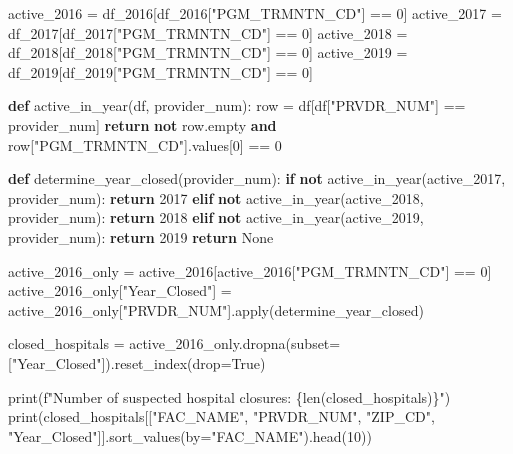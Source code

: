 \documentclass[
  letterpaper,
  DIV=11,
  numbers=noendperiod]{scrartcl}
\newenvironment{Shaded}{\begin{snugshade}}{\end{snugshade}}
\newcommand{\BuiltInTok}[1]{\textcolor[rgb]{0.00,0.23,0.31}{#1}}
\newcommand{\ControlFlowTok}[1]{\textcolor[rgb]{0.00,0.23,0.31}{\textbf{#1}}}
\newcommand{\DecValTok}[1]{\textcolor[rgb]{0.68,0.00,0.00}{#1}}
\newcommand{\KeywordTok}[1]{\textcolor[rgb]{0.00,0.23,0.31}{\textbf{#1}}}
\newcommand{\NormalTok}[1]{\textcolor[rgb]{0.00,0.23,0.31}{#1}}
\newcommand{\OperatorTok}[1]{\textcolor[rgb]{0.37,0.37,0.37}{#1}}
\newcommand{\SpecialCharTok}[1]{\textcolor[rgb]{0.37,0.37,0.37}{#1}}
\newcommand{\SpecialStringTok}[1]{\textcolor[rgb]{0.13,0.47,0.30}{#1}}
\newcommand{\StringTok}[1]{\textcolor[rgb]{0.13,0.47,0.30}{#1}}
\newcommand{\VariableTok}[1]{\textcolor[rgb]{0.07,0.07,0.07}{#1}}
\begin{document}
\begin{Shaded}
\begin{Highlighting}[]
\NormalTok{active\_2016 }\OperatorTok{=}\NormalTok{ df\_2016[df\_2016[}\StringTok{"PGM\_TRMNTN\_CD"}\NormalTok{] }\OperatorTok{==} \DecValTok{0}\NormalTok{]}
\NormalTok{active\_2017 }\OperatorTok{=}\NormalTok{ df\_2017[df\_2017[}\StringTok{"PGM\_TRMNTN\_CD"}\NormalTok{] }\OperatorTok{==} \DecValTok{0}\NormalTok{]}
\NormalTok{active\_2018 }\OperatorTok{=}\NormalTok{ df\_2018[df\_2018[}\StringTok{"PGM\_TRMNTN\_CD"}\NormalTok{] }\OperatorTok{==} \DecValTok{0}\NormalTok{]}
\NormalTok{active\_2019 }\OperatorTok{=}\NormalTok{ df\_2019[df\_2019[}\StringTok{"PGM\_TRMNTN\_CD"}\NormalTok{] }\OperatorTok{==} \DecValTok{0}\NormalTok{]}

\KeywordTok{def}\NormalTok{ active\_in\_year(df, provider\_num):}
\NormalTok{    row }\OperatorTok{=}\NormalTok{ df[df[}\StringTok{"PRVDR\_NUM"}\NormalTok{] }\OperatorTok{==}\NormalTok{ provider\_num]}
    \ControlFlowTok{return} \KeywordTok{not}\NormalTok{ row.empty }\KeywordTok{and}\NormalTok{ row[}\StringTok{"PGM\_TRMNTN\_CD"}\NormalTok{].values[}\DecValTok{0}\NormalTok{] }\OperatorTok{==} \DecValTok{0}

\KeywordTok{def}\NormalTok{ determine\_year\_closed(provider\_num):}
    \ControlFlowTok{if} \KeywordTok{not}\NormalTok{ active\_in\_year(active\_2017, provider\_num):}
        \ControlFlowTok{return} \DecValTok{2017}
    \ControlFlowTok{elif} \KeywordTok{not}\NormalTok{ active\_in\_year(active\_2018, provider\_num):}
        \ControlFlowTok{return} \DecValTok{2018}
    \ControlFlowTok{elif} \KeywordTok{not}\NormalTok{ active\_in\_year(active\_2019, provider\_num):}
        \ControlFlowTok{return} \DecValTok{2019}
    \ControlFlowTok{return} \VariableTok{None}

\NormalTok{active\_2016\_only }\OperatorTok{=}\NormalTok{ active\_2016[active\_2016[}\StringTok{"PGM\_TRMNTN\_CD"}\NormalTok{] }\OperatorTok{==} \DecValTok{0}\NormalTok{]}
\NormalTok{active\_2016\_only[}\StringTok{"Year\_Closed"}\NormalTok{] }\OperatorTok{=}\NormalTok{ active\_2016\_only[}\StringTok{"PRVDR\_NUM"}\NormalTok{].}\BuiltInTok{apply}\NormalTok{(determine\_year\_closed)}

\NormalTok{closed\_hospitals }\OperatorTok{=}\NormalTok{ active\_2016\_only.dropna(subset}\OperatorTok{=}\NormalTok{[}\StringTok{"Year\_Closed"}\NormalTok{]).reset\_index(drop}\OperatorTok{=}\VariableTok{True}\NormalTok{)}

\BuiltInTok{print}\NormalTok{(}\SpecialStringTok{f"Number of suspected hospital closures: }\SpecialCharTok{\{}\BuiltInTok{len}\NormalTok{(closed\_hospitals)}\SpecialCharTok{\}}\SpecialStringTok{"}\NormalTok{)}
\BuiltInTok{print}\NormalTok{(closed\_hospitals[[}\StringTok{"FAC\_NAME"}\NormalTok{, }\StringTok{"PRVDR\_NUM"}\NormalTok{, }\StringTok{"ZIP\_CD"}\NormalTok{, }\StringTok{"Year\_Closed"}\NormalTok{]].sort\_values(by}\OperatorTok{=}\StringTok{"FAC\_NAME"}\NormalTok{).head(}\DecValTok{10}\NormalTok{))}
\end{Highlighting}
\end{Shaded}
\end{document}
